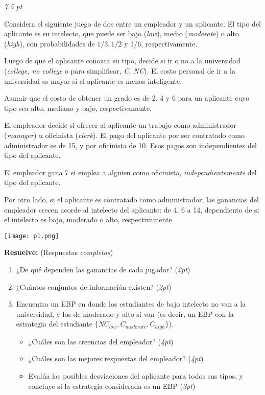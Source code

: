 \documentclass[12pt]{scrartcl} %
\begin{document}
\begin{Exercise}[title={Subasta de sobre cerrado con $n$ jugadores},name={Pregunta}]
  \textit{7.5 pt}

  Considera el siguiente juego de dos entre un empleador y un aplicante. El tipo del aplicante es su intelecto, que puede ser bajo (\textit{low}), medio (\textit{moderate}) o alto (\textit{high}), con probabilidades de $ 1/3, 1/2 $ y 1/6, respectivamente. 

  Luego de que el aplicante conozca su tipo, decide si ir o no a la universidad (\textit{college, no college} o para simplificar, \textit{C, NC}). El costo personal de ir a la universidad es mayor si el aplicante es menos inteligente.
  
  Asumir que el costo de obtener un grado es de 2, 4 y 6 para un aplicante cuyo tipo sea alto, mediano y bajo, respectivamente. 

  El empleador decide si ofrecer al aplicante un trabajo como administrador (\textit{manager}) u oficinista (\textit{clerk}). El pago del aplicante por ser contratado como administrador es de 15, y por oficinista de 10. Esos pagos son independientes del tipo del aplicante. 

  El empleador gana 7 si emplea a alguien como oficinista, \textit{independientemente} del tipo del aplicante. 

  Por otro lado, si el aplicante es contratado como administrador, las ganancias del empleador crecen acorde al intelecto del aplicante: de 4, 6 a 14, dependiento de si el intelecto es bajo, moderado o alto, respectivamente.

\begin{center}
  \texttt{[image: p1.png]}
\end{center}

\textbf{Resuelve:}
(Respuestas \textit{completas})

\begin{enumerate}
  \setlength{\itemsep}{0pt}
  \setlength{\parskip}{0pt}
  \setlength{\parsep}{0pt}
  \item ¿De qué dependen las ganancias de cada jugador? (\textit{2pt})
  \item ¿Cuántos conjuntos de información existen? (\textit{2pt})
  \item Encuentra un EBP en donde los estudiantes de bajo intelecto no van a la universidad, y los de moderado y alto sí van (es decir, un EBP con la estrategia del estudiante $ \{NC_{low}, C_{moderate}, C_{high}\} $).
  \begin{itemize}
    \item ¿Cuáles son las creencias del empleador? (\textit{4pt})
    \item ¿Cuáles son las mejores respuestas del empleador? (\textit{4pt})
    \item Evalúa las posibles desviaciones del aplicante para todos sus tipos, y concluye si la estrategia considerada es un EBP (\textit{3pt})
  \end{itemize}
\end{enumerate}


\end{Exercise}
\end{document}
